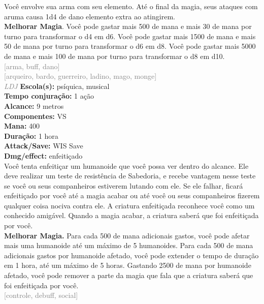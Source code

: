 \documentclass{RPG_Adventure}[2021/10/20]
\begin{document}
{\normalsize Você envolve sua arma com seu elemento. Até o final da magia, seus ataques com aruma causa 1d4 de dano elemento extra ao atingirem.\\\t \textbf{Melhorar Magia}. Você pode gastar mais 500 de mana e mais 30 de mana por turno para transformar o d4 em d6. Você pode gastar mais 1500 de mana e mais 50 de mana por turno para transformar o d6 em d8. Você pode gastar mais 5000 de mana e mais 100 de mana por turno para transformar o d8 em d10.\\}
{\scriptsize \textcolor{gray}{[arma, buff, dano]\\}}
{\scriptsize \textcolor{gray}{[arqueiro, bardo, guerreiro, ladino, mago, monge]\\}}
{\tiny \textcolor{gray}{\textit{LDJ}}}
{\small \t \textbf{Escola(s):} psíquica, musical\\\t \textbf{Tempo conjuração:} 1 ação\\\t \textbf{Alcance:} 9 metros\\\t \textbf{Componentes:} VS\\\t \textbf{Mana:} 400\\\t \textbf{Duração:} 1 hora\\\t \textbf{Attack/Save:} WIS Save\\\t \textbf{Dmg/effect:} enfeitiçado\\}
{\normalsize Você tenta enfeitiçar um humanoide que você possa ver dentro do alcance. Ele deve realizar um teste de resistência de Sabedoria, e recebe vantagem nesse teste se você ou seus companheiros estiverem lutando com ele.  Se ele falhar, ficará enfeitiçado por você até a magia acabar ou até você ou seus companheiros fizerem qualquer coisa nociva contra ele. A criatura enfeitiçada reconhece você como um conhecido amigável. Quando a magia acabar, a criatura saberá que foi enfeitiçada por você.\\\t \textbf{Melhorar Magia.} Para cada 500 de mana adicionais gastos, você pode afetar mais uma humanoide até um máximo de 5 humanoides. Para cada 500 de mana adicionais gastos por humanoide afetado, você pode extender o tempo de duração em 1 hora, até um máximo de 5 horas. Gastando 2500 de mana por humanoide afetado, você pode remover a parte da magia que fala que a criatura saberá que foi enfeitiçada por você.\\}
{\scriptsize \textcolor{gray}{[controle, debuff, social]\\}}
\end{document}
